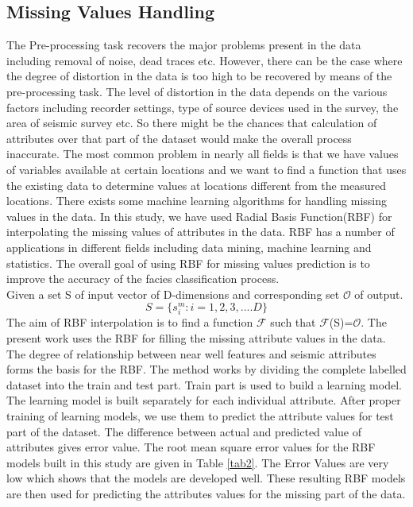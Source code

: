 \documentclass[a4paper]{article}
\begin{document}
\subsection{Missing Values Handling}
The Pre-processing task recovers the major problems present in the data including removal of noise, dead traces etc. However, there can be the case where the degree of distortion in the data is too high to be recovered by means of the pre-processing task. The level of distortion in the data depends on the various factors including recorder settings, type of source devices used in the survey, the area of seismic survey etc. So there might be the chances that calculation of attributes over that part of the dataset would make the overall process inaccurate. The most common problem in nearly all fields is that we have values of variables available at certain locations and we want to find a function that uses the existing data to determine values at locations different from the measured locations. There exists some machine learning algorithms\cite{ml} for handling missing values in the data. In this study, we have used Radial Basis Function(RBF)\cite{rbf} for interpolating the missing values of attributes in the data. 
RBF has a number of applications in different fields including data mining\cite{rbf}, machine learning\cite{rbf1} and statistics\cite{rbf1}. The overall goal of using RBF for missing values prediction is to improve the accuracy of the facies classification process.  \\
Given a set S of input vector of D-dimensions and corresponding set $\mathcal{O}$ of output.
\begin{equation}
S=\{s_{i}^{m} : i=1,2,3,....D\}
\end{equation} 
The aim of RBF interpolation\cite{rbf1} is to find a function $\mathcal{F}$ such that
$\mathcal{F}$(S)=$\mathcal{O}$. The present work uses the RBF for filling the missing attribute values in the data. The degree of relationship between near well features and seismic attributes forms the basis for the RBF. The method works by dividing the complete labelled dataset into the train and test part. Train part is used to build a learning model. The learning model is built separately for each individual attribute. After proper training of learning models, we use them to predict the attribute values for test part of the dataset. The difference between actual and predicted value of attributes gives error value. The root mean square error values for the RBF models built in this study are given in Table \ref{tab2}. The Error Values are very low which shows that the models are developed well. These resulting RBF models are then used for predicting the attributes values for the missing part of the data.
\end{document}
